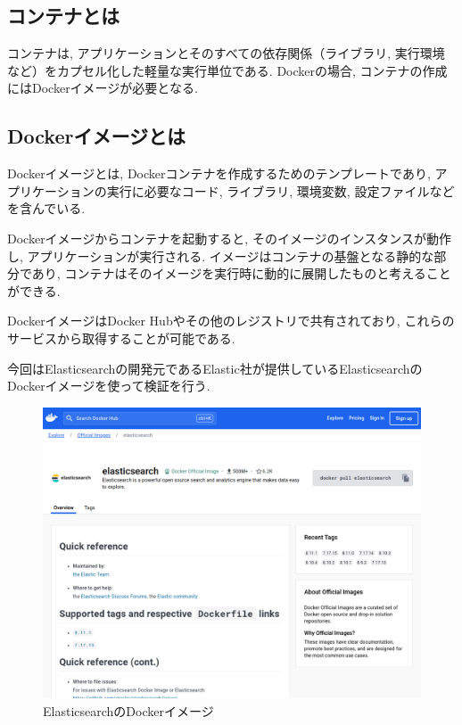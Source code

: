 \documentclass[a4j,12pt,]{jarticle}
\begin{document}
\subsection{コンテナとは}

コンテナは, アプリケーションとそのすべての依存関係（ライブラリ, 実行環境など）をカプセル化した軽量な実行単位である.
Dockerの場合, コンテナの作成にはDockerイメージが必要となる.

\subsection{Dockerイメージとは}

Dockerイメージとは, Dockerコンテナを作成するためのテンプレートであり, アプリケーションの実行に必要なコード, ライブラリ, 環境変数, 設定ファイルなどを含んでいる.

Dockerイメージからコンテナを起動すると, そのイメージのインスタンスが動作し, アプリケーションが実行される. イメージはコンテナの基盤となる静的な部分であり, コンテナはそのイメージを実行時に動的に展開したものと考えることができる.

DockerイメージはDocker Hubやその他のレジストリで共有されており, これらのサービスから取得することが可能である.

今回はElasticsearchの開発元であるElastic社が提供しているElasticsearchのDockerイメージを使って検証を行う.

\begin{figure}[H]
  \begin{center}
    \includegraphics[width=160mm]{elasticsearch-image.png}
    \caption{ElasticsearchのDockerイメージ}
    \label{s0}
  \end{center}
\end{figure}
\end{document}
